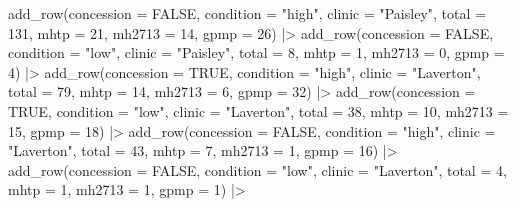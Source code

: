 \documentclass[
  letterpaper,
  DIV=11,
  numbers=noendperiod,
  oneside]{scrartcl}
\newenvironment{Shaded}{\begin{snugshade}}{\end{snugshade}}
\newcommand{\AttributeTok}[1]{\textcolor[rgb]{0.40,0.45,0.13}{#1}}
\newcommand{\ConstantTok}[1]{\textcolor[rgb]{0.56,0.35,0.01}{#1}}
\newcommand{\DecValTok}[1]{\textcolor[rgb]{0.68,0.00,0.00}{#1}}
\newcommand{\FunctionTok}[1]{\textcolor[rgb]{0.28,0.35,0.67}{#1}}
\newcommand{\NormalTok}[1]{\textcolor[rgb]{0.00,0.23,0.31}{#1}}
\newcommand{\SpecialCharTok}[1]{\textcolor[rgb]{0.37,0.37,0.37}{#1}}
\newcommand{\StringTok}[1]{\textcolor[rgb]{0.13,0.47,0.30}{#1}}
\begin{document}
\begin{Shaded}
\begin{Highlighting}[]
  \FunctionTok{add\_row}\NormalTok{(}\AttributeTok{concession =} \ConstantTok{FALSE}\NormalTok{, }\AttributeTok{condition =} \StringTok{"high"}\NormalTok{, }\AttributeTok{clinic =} \StringTok{"Paisley"}\NormalTok{, }\AttributeTok{total =} \DecValTok{131}\NormalTok{, }\AttributeTok{mhtp =} \DecValTok{21}\NormalTok{, }\AttributeTok{mh2713 =} \DecValTok{14}\NormalTok{, }\AttributeTok{gpmp =} \DecValTok{26}\NormalTok{) }\SpecialCharTok{|\textgreater{}}
  \FunctionTok{add\_row}\NormalTok{(}\AttributeTok{concession =} \ConstantTok{FALSE}\NormalTok{, }\AttributeTok{condition =} \StringTok{"low"}\NormalTok{, }\AttributeTok{clinic =} \StringTok{"Paisley"}\NormalTok{, }\AttributeTok{total =} \DecValTok{8}\NormalTok{, }\AttributeTok{mhtp =} \DecValTok{1}\NormalTok{, }\AttributeTok{mh2713 =} \DecValTok{0}\NormalTok{, }\AttributeTok{gpmp =} \DecValTok{4}\NormalTok{) }\SpecialCharTok{|\textgreater{}}
  \FunctionTok{add\_row}\NormalTok{(}\AttributeTok{concession =} \ConstantTok{TRUE}\NormalTok{, }\AttributeTok{condition =} \StringTok{"high"}\NormalTok{, }\AttributeTok{clinic =} \StringTok{"Laverton"}\NormalTok{, }\AttributeTok{total =} \DecValTok{79}\NormalTok{, }\AttributeTok{mhtp =} \DecValTok{14}\NormalTok{, }\AttributeTok{mh2713 =} \DecValTok{6}\NormalTok{, }\AttributeTok{gpmp =} \DecValTok{32}\NormalTok{) }\SpecialCharTok{|\textgreater{}}
  \FunctionTok{add\_row}\NormalTok{(}\AttributeTok{concession =} \ConstantTok{TRUE}\NormalTok{, }\AttributeTok{condition =} \StringTok{"low"}\NormalTok{, }\AttributeTok{clinic =} \StringTok{"Laverton"}\NormalTok{, }\AttributeTok{total =} \DecValTok{38}\NormalTok{, }\AttributeTok{mhtp =} \DecValTok{10}\NormalTok{, }\AttributeTok{mh2713 =} \DecValTok{15}\NormalTok{, }\AttributeTok{gpmp =} \DecValTok{18}\NormalTok{) }\SpecialCharTok{|\textgreater{}}
  \FunctionTok{add\_row}\NormalTok{(}\AttributeTok{concession =} \ConstantTok{FALSE}\NormalTok{, }\AttributeTok{condition =} \StringTok{"high"}\NormalTok{, }\AttributeTok{clinic =} \StringTok{"Laverton"}\NormalTok{, }\AttributeTok{total =} \DecValTok{43}\NormalTok{, }\AttributeTok{mhtp =} \DecValTok{7}\NormalTok{, }\AttributeTok{mh2713 =} \DecValTok{1}\NormalTok{, }\AttributeTok{gpmp =} \DecValTok{16}\NormalTok{) }\SpecialCharTok{|\textgreater{}}
  \FunctionTok{add\_row}\NormalTok{(}\AttributeTok{concession =} \ConstantTok{FALSE}\NormalTok{, }\AttributeTok{condition =} \StringTok{"low"}\NormalTok{, }\AttributeTok{clinic =} \StringTok{"Laverton"}\NormalTok{, }\AttributeTok{total =} \DecValTok{4}\NormalTok{, }\AttributeTok{mhtp =} \DecValTok{1}\NormalTok{, }\AttributeTok{mh2713 =} \DecValTok{1}\NormalTok{, }\AttributeTok{gpmp =} \DecValTok{1}\NormalTok{) }\SpecialCharTok{|\textgreater{}}

\end{Highlighting}
\end{Shaded}
\end{document}
